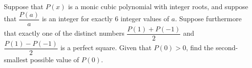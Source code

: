 Suppose that $P(x)$ is a monic cubic polynomial with integer roots, and suppose that $\dfrac{P(a)}{a}$ is an integer for exactly $6$ integer values of $a$. Suppose furthermore that exactly one of the distinct numbers $\dfrac{P(1) + P(-1)}{2}$ and $\dfrac{P(1) - P(-1)}{2}$ is a perfect square. Given that $P(0) > 0$, find the second-smallest possible value of $P(0).$
